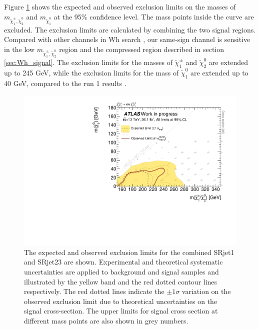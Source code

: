 Figure \ref{fig:result_exclusion_limit} shows the expected and observed exclusion limits on the masses of $m_{\tilde{\chi}_1^\pm, \tilde{\chi}_2^0}$ and $m_{\tilde{\chi}_1^0}$ at the 95\% confidence level.
The mass points inside the curve are excluded.
The exclusion limits are calculated by combining the two signal regions.
Compared with other channels in Wh search \cite{Wh}, our same-sign channel is sensitive in the low $m_{\tilde{\chi}_1^\pm, \tilde{\chi}_2^0}$ region and the compressed region described in section \ref{sec:Wh_signal}.
The exclusion limits for the masses of $\tilde{\chi}_1^\pm$ and $\tilde{\chi}_2^0$ are extended up to 245 GeV, while the exclusion limits for the mass of $\tilde{\chi}_1^0$ are extended up to 40 GeV, compared to the run 1 results \cite{run1}.

\begin{figure}[htbp]
\centering
\includegraphics[width=\textwidth]{data/plot/HistFitterResults/contourPlotterWhSS_upperLimit.pdf}
\caption{The expected and observed exclusion limits for the combined SRjet1 and SRjet23 are shown. Experimental and theoretical systematic uncertainties are applied to background and signal samples and illustrated by the yellow band and the red dotted contour lines respectively. The red dotted lines indicate the $\pm 1 \sigma$ variation on the observed exclusion limit due to theoretical uncertainties on the signal cross-section. The upper limits for signal cross section at different mass points are also shown in grey numbers.}
\label{fig:result_exclusion_limit}
\end{figure}

%

